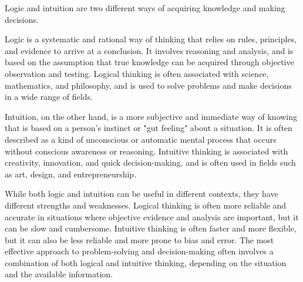 Logic and intuition are two different ways of acquiring knowledge and making decisions. 

Logic is a systematic and rational way of thinking that relies on rules, principles, and evidence to arrive at a conclusion. It involves reasoning and analysis, and is based on the assumption that true knowledge can be acquired through objective observation and testing. Logical thinking is often associated with science, mathematics, and philosophy, and is used to solve problems and make decisions in a wide range of fields.

Intuition, on the other hand, is a more subjective and immediate way of knowing that is based on a person's instinct or "gut feeling" about a situation. It is often described as a kind of unconscious or automatic mental process that occurs without conscious awareness or reasoning. Intuitive thinking is associated with creativity, innovation, and quick decision-making, and is often used in fields such as art, design, and entrepreneurship.

While both logic and intuition can be useful in different contexts, they have different strengths and weaknesses. Logical thinking is often more reliable and accurate in situations where objective evidence and analysis are important, but it can be slow and cumbersome. Intuitive thinking is often faster and more flexible, but it can also be less reliable and more prone to bias and error. The most effective approach to problem-solving and decision-making often involves a combination of both logical and intuitive thinking, depending on the situation and the available information.